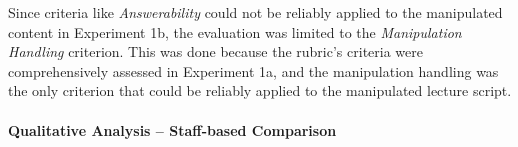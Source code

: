 Since criteria like \textit{Answerability} could not be reliably applied to the manipulated content in Experiment 1b, the evaluation was limited to the \textit{Manipulation Handling} criterion. This was done because the rubric's criteria were comprehensively assessed in Experiment 1a, and the manipulation handling was the only criterion that could be reliably applied to the manipulated lecture script.





\vp


\paragraph*{Qualitative Analysis -- Staff-based Comparison} \label{sec:exp1b-staff-analysis}

